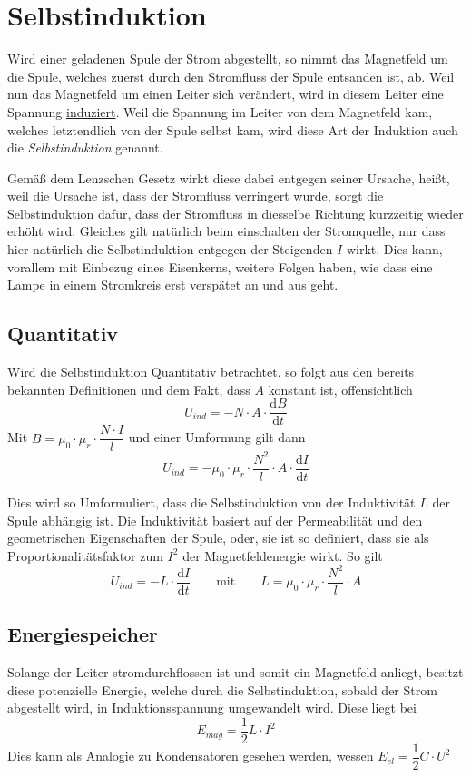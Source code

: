 \documentclass{article}
\begin{document}
 
 
\newcommand{\derive}[2]{\frac{\mathrm{d}#1}{\mathrm{d}#2}} 
 
\section{Selbstinduktion} 
Wird einer geladenen Spule der Strom abgestellt, so nimmt das Magnetfeld um die Spule, welches zuerst durch den Stromfluss der Spule entsanden ist, ab. Weil nun das Magnetfeld um einen Leiter sich verändert, wird in diesem Leiter eine Spannung \hyperref[Induktion]{induziert}. Weil die Spannung im Leiter von dem Magnetfeld kam, welches letztendlich von der Spule selbst kam, wird diese Art der Induktion auch die \emph{Selbstinduktion} genannt.
 
Gemäß dem Lenzschen Gesetz wirkt diese dabei entgegen seiner Ursache, heißt, weil die Ursache ist, dass der Stromfluss verringert wurde, sorgt die Selbstinduktion dafür, dass der Stromfluss in diesselbe Richtung kurzzeitig wieder erhöht wird. Gleiches gilt natürlich beim einschalten der Stromquelle, nur dass hier natürlich die Selbstinduktion entgegen der Steigenden $I$ wirkt. Dies kann, vorallem mit Einbezug eines Eisenkerns, weitere Folgen haben, wie dass eine Lampe in einem Stromkreis erst verspätet an und aus geht.
 
\subsection{Quantitativ} 
Wird die Selbstinduktion Quantitativ betrachtet, so folgt aus den bereits bekannten Definitionen und dem Fakt, dass $A$ konstant ist, offensichtlich
\[
 U_{ind} = -N \cdot A \cdot \derive{B}{t}
\] 
Mit $B = \mu_0 \cdot \mu_r \cdot \dfrac{N \cdot I}{l}$ und einer Umformung gilt dann
\[
 U_{ind} = -\mu_0 \cdot \mu_r \cdot \frac{N^2}{l} \cdot A \cdot \derive{I}{t} 
\]
 
Dies wird so Umformuliert, dass die Selbstinduktion von der Induktivität $L$ der Spule abhängig ist. Die Induktivität basiert auf der Permeabilität und den geometrischen Eigenschaften der Spule, oder, sie ist so definiert, dass sie als Proportionalitätsfaktor zum $I^2$ der Magnetfeldenergie wirkt. So gilt
\[
 U_{ind} = -L \cdot \derive{I}{t}
 \qquad \text{mit} \qquad
 L = \mu_0 \cdot \mu_r \cdot \frac{N^2}{l} \cdot A  
\]
 
\subsection{Energiespeicher}
Solange der Leiter stromdurchflossen ist und somit ein Magnetfeld anliegt, besitzt diese potenzielle Energie, welche durch die Selbstinduktion, sobald der Strom abgestellt wird, in Induktionsspannung umgewandelt wird. Diese liegt bei
\[
 E_{mag} = \frac{1}{2} L \cdot I^2 
\]
Dies kann als Analogie zu \hyperref[Kondensator]{Kondensatoren} gesehen werden, wessen $E_{el} = \dfrac{1}{2} C \cdot U^2$ 
\end{document}
